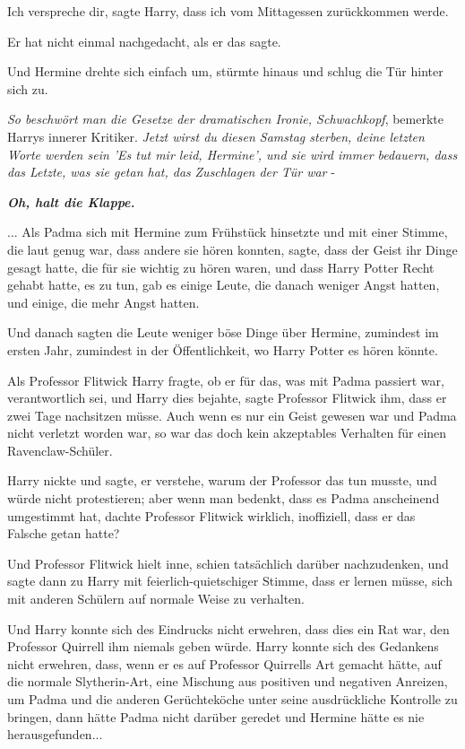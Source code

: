 \glqq{}Ich verspreche dir\grqq{}, sagte Harry, \glqq{}dass ich vom Mittagessen
zurückkommen werde.\grqq{}

Er hat nicht einmal nachgedacht, als er das sagte.

Und Hermine drehte sich einfach um, stürmte hinaus und schlug die Tür hinter
sich zu.

\emph{So beschwört man die Gesetze der dramatischen Ironie, Schwachkopf},
bemerkte Harrys innerer Kritiker. \emph{ Jetzt wirst du diesen Samstag sterben,
deine letzten Worte werden sein 'Es tut mir leid, Hermine', und sie wird immer
bedauern, dass das Letzte, was sie getan hat, das} \emph{Zuschlagen der Tür war}
-

\textbf{\emph{Oh, halt die Klappe.}}

... Als Padma sich mit Hermine zum Frühstück hinsetzte und mit einer Stimme, die
laut genug war, dass andere sie hören konnten, sagte, dass der Geist ihr Dinge
gesagt hatte, die für sie wichtig zu hören waren, und dass Harry Potter Recht
gehabt hatte, es zu tun, gab es einige Leute, die danach weniger Angst hatten,
und einige, die mehr Angst hatten.

Und danach sagten die Leute weniger böse Dinge über Hermine, zumindest im ersten
Jahr, zumindest in der Öffentlichkeit, wo Harry Potter es hören könnte.

Als Professor Flitwick Harry fragte, ob er für das, was mit Padma passiert war,
verantwortlich sei, und Harry dies bejahte, sagte Professor Flitwick ihm, dass
er zwei Tage nachsitzen müsse. Auch wenn es nur ein Geist gewesen war und Padma
nicht verletzt worden war, so war das doch kein akzeptables Verhalten für einen
Ravenclaw-Schüler.

Harry nickte und sagte, er verstehe, warum der Professor das tun musste, und
würde nicht protestieren; aber wenn man bedenkt, dass es Padma anscheinend
umgestimmt hat, dachte Professor Flitwick wirklich, inoffiziell, dass er das
Falsche getan hatte?

Und Professor Flitwick hielt inne, schien tatsächlich darüber nachzudenken, und
sagte dann zu Harry mit feierlich-quietschiger Stimme, dass er lernen müsse,
sich mit anderen Schülern auf normale Weise zu verhalten.

Und Harry konnte sich des Eindrucks nicht erwehren, dass dies ein Rat war, den
Professor Quirrell ihm niemals geben würde. Harry konnte sich des Gedankens
nicht erwehren, dass, wenn er es auf Professor Quirrells Art gemacht hätte, auf
die normale Slytherin-Art, eine Mischung aus positiven und negativen Anreizen,
um Padma und die anderen Gerüchteköche unter seine ausdrückliche Kontrolle zu
bringen, dann hätte Padma nicht darüber geredet und Hermine hätte es nie
herausgefunden...

